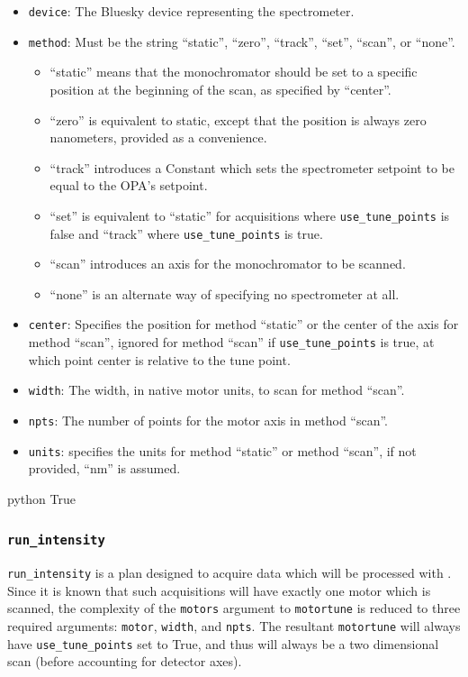 \begin{itemize}
	\item \texttt{device}: The Bluesky device representing the spectrometer.
	\item \texttt{method}: Must be the string ``static'', ``zero'', ``track'', ``set'', ``scan'', or ``none''.
		\begin{itemize}
			\item ``static'' means that the monochromator should be set to a specific position at the beginning of the scan, as specified by ``center''.
			\item ``zero'' is equivalent to static, except that the position is always zero nanometers, provided as a convenience.
			\item ``track'' introduces a Constant which sets the spectrometer setpoint to be equal to the OPA's setpoint.
			\item ``set'' is equivalent to ``static'' for acquisitions where \texttt{use\_tune\_points} is false and ``track'' where \texttt{use\_tune\_points} is true.
			\item ``scan'' introduces an axis for the monochromator to be scanned.
			\item ``none'' is an alternate way of specifying no spectrometer at all.
		\end{itemize}
	\item \texttt{center}: Specifies the position for method ``static'' or the center of the axis for method ``scan'', ignored for method ``scan'' if \texttt{use\_tune\_points} is true, at which point center is relative to the tune point.
	\item \texttt{width}: The width, in native motor units, to scan for method ``scan''.
	\item \texttt{npts}: The number of points for the motor axis in method ``scan''.
	\item \texttt{units}: specifies the units for method ``static'' or method ``scan'', if not provided, ``nm'' is assumed.
\end{itemize}

\begin{codefragment}{python}
True
\end{codefragment}

\subsubsection{\texttt{run\_intensity}}

\texttt{run\_intensity} is a plan designed to acquire data which will be processed with .
Since it is known that such acquisitions will have exactly one motor which is scanned, the complexity of the \texttt{motors} argument to \texttt{motortune} is reduced to three required arguments: \texttt{motor}, \texttt{width}, and \texttt{npts}.
The resultant \texttt{motortune} will always have \texttt{use\_tune\_points} set to True, and thus will always be a two dimensional scan (before accounting for detector axes).


